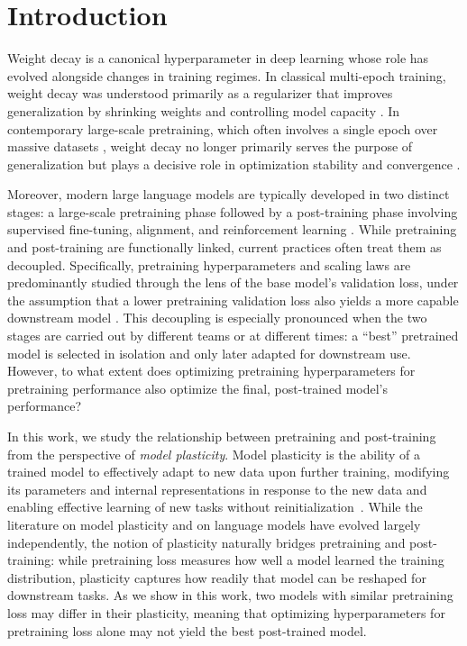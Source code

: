 \section{Introduction}
\label{sec:intro}


Weight decay is a canonical hyperparameter in deep learning whose role has evolved alongside changes in training regimes. In classical multi-epoch training, weight decay was understood primarily as a regularizer that improves generalization by shrinking weights and controlling model capacity \citep{hardt2016train, zhang2017understanding, sun2025investigating}. In contemporary large-scale pretraining, which often involves a single epoch over massive datasets \citep{brown2020language, kaplan2020scaling}, weight decay no longer primarily serves the purpose of generalization but plays a decisive role in optimization stability and convergence \citep{andriushchenko2023whywd, zhangdoes, wang2024set}. 

Moreover, modern large language models are typically developed in two distinct stages: a large-scale pretraining phase followed by a post-training phase involving supervised fine-tuning, alignment, and reinforcement learning \citep{brown2020language,instruct_gpt, bi2024deepseek,lambert2024tulu}. While pretraining and post-training are functionally linked, current practices often treat them as decoupled. Specifically, pretraining hyperparameters and scaling laws are predominantly studied through the lens of the base model's validation loss, under the assumption that a lower pretraining validation loss also yields a more capable downstream model \citep{hoffmann2022training,bi2024deepseek}. This decoupling is especially pronounced when the two stages are carried out by different teams or at different times: a ``best'' pretrained model is selected in isolation and only later adapted for downstream use. However, to what extent does optimizing pretraining hyperparameters for pretraining performance also optimize the final, post-trained model's performance?

In this work, we study the relationship between pretraining and post-training from the perspective of \textit{model plasticity}. Model plasticity is the ability of a trained model to effectively adapt to new data upon further training, modifying its parameters and internal representations in response to the new data and enabling effective learning of new tasks without reinitialization~\citep{berariu2021study,dohare2024loss}. 
While the literature on model plasticity and on language models have evolved largely independently, the notion of plasticity naturally bridges pretraining and post-training: while pretraining loss measures how well a model learned the training distribution, plasticity captures how readily that model can be reshaped for downstream tasks. As we show in this work, two models with similar pretraining loss may differ in their plasticity, meaning that optimizing hyperparameters for pretraining loss alone may not yield the best post-trained model.


